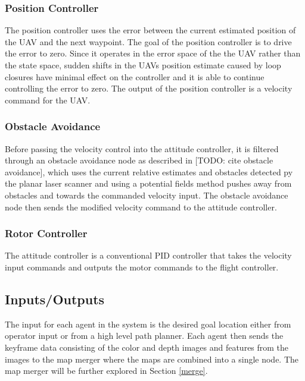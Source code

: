 \documentclass[letterpaper, 10 pt, conference]{ieeeconf}  %
\newcommand{\todo}[1]{{\color{blue}[TODO: #1]}}
\begin{document}
\subsubsection{Position Controller}

The position controller uses the error between the current estimated position of the UAV and the next waypoint. The goal of the position controller is to drive the error to zero. Since it operates in the error space of the the UAV rather than the state space, sudden shifts in the UAVs position estimate caused by loop closures have minimal effect on the controller and it is able to continue controlling the error to zero. The output of the position controller is a velocity command for the UAV.

\subsubsection{Obstacle Avoidance}

Before passing the velocity control into the attitude controller, it is filtered through an obstacle avoidance node as described in \todo{cite obstacle avoidance}, which uses the current relative estimates and obstacles detected py the planar laser scanner and using a potential fields method pushes away from obstacles and towards the commanded velocity input. The obstacle avoidance node then sends the modified velocity command to the attitude controller.

\subsubsection{Rotor Controller}

The attitude controller is a conventional PID controller that takes the velocity input commands and outputs the motor commands to the flight controller.

\subsection{Inputs/Outputs}

The input for each agent in the system is the desired goal location either from operator input or from a high level path planner. Each agent then sends the keyframe data consisting of the color and depth images and features from the images to the map merger where the maps are combined into a single node. The map merger will be further explored in Section \ref{merge}.
\end{document}
